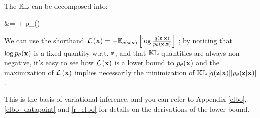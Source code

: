 The $\mathbb{KL}$ can be decomposed  into:

\begin{nalign}
&= 
+ \log p_\theta(\boldx)
\end{nalign}

We can use the shorthand $\mathcal{L}\left(\mathbf{x}\right) = - 
\mathbb{E}_{q(\mathbf{z}|\mathbf{x})}\left[ 
    \log\frac{
        q(\mathbf{z}|\mathbf{x}) 
    }{
        p_\theta(\mathbf{x},\mathbf{z})
    }
 \right]
$ ; by noticing that $\log p_\theta(\mathbf{x})$
is a fixed quantity w.r.t. $\mathbf{z}$,
and that $\mathbb{KL}$ quantities are
always non-negative,
it's easy to see how $\mathcal{L}\left(\mathbf{x}\right)$
is a lower bound to $p_\theta(\mathbf{x})$
and the maximization of $\mathcal{L}\left(\mathbf{x}\right)$
implies necessarily the minimization of 
$\mathbb{KL}\left[ q(\mathbf{z}|\mathbf{x}) || p_\theta(\mathbf{z}|\mathbf{x}) \right]$
.

This is the basis of variational inference, and 
you can refer to Appendix \ref{elbo},  
\ref{elbo_datapoint}
and
\ref{r_elbo}
for details on the derivations of the lower bound.

